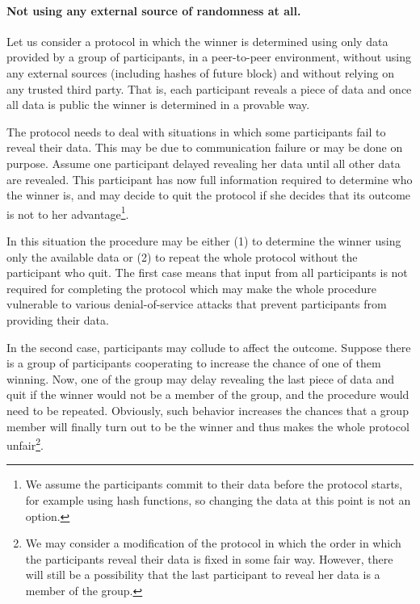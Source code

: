 \documentclass[a4paper]{article}
\begin{document}
    \paragraph{Not using any external source of randomness at all.}
    Let us consider a protocol in which the winner is determined using only data provided by a group of participants,
    in a peer-to-peer environment, without using any external sources (including hashes of future block) and without
    relying on any trusted third party. That is, each participant reveals a piece of data and once all data is public
    the winner is determined in a provable way.

    The protocol needs to deal with situations in which some participants fail to reveal their data. This may be due
    to communication failure or may be done on purpose. Assume one participant delayed revealing her data until all
    other data are revealed. This participant has now full information required to determine who the winner is,
    and may decide to quit the protocol if she decides that its outcome is not to her advantage\footnote{We assume
    the participants commit to their data before the protocol starts, for example using hash functions,
    so changing the data at this point is not an option.}.

    In this situation the procedure may be either (1) to determine the winner using only the available data or (2)
    to repeat the whole protocol without the participant who quit. The first case means that input from all
    participants is not required for completing the protocol which may make the whole procedure vulnerable to
    various denial-of-service attacks that prevent participants from providing their data.

    In the second case, participants may collude to affect the outcome. Suppose there is a group of participants
    cooperating to increase the chance of one of them winning. Now, one of the group may delay revealing the last
    piece of data and quit if the winner would not be a member of the group, and the procedure would need to be
    repeated. Obviously, such behavior increases the chances that a group member will finally turn out to be the
    winner and thus makes the whole protocol unfair\footnote{We may consider a modification of the protocol in which
    the order in which the participants reveal their data is fixed in some fair way. However, there will still be
    a possibility that the last participant to reveal her data is a member of the group.}.
\end{document}
